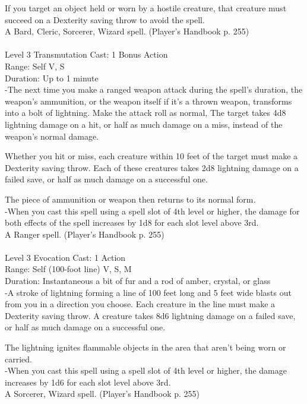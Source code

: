 \documentclass[10pt,twocolumn]{report}
\begin{document}
If you target an object held or worn by a hostile creature, that creature must succeed on a Dexterity saving throw to avoid the spell.\\
A Bard, Cleric, Sorcerer, Wizard spell. (Player's Handbook p. 255) \\


 \\
Level 3 \quad Transmutation \quad Cast: 1 Bonus Action\\
Range: Self \quad V, S\\
Duration: Up to 1 minute \quad \\
-The next time you make a ranged weapon attack during the spell’s duration, the weapon’s ammunition, or the weapon itself if it’s a thrown weapon, transforms into a bolt of lightning. Make the attack roll as normal, The target takes 4d8 lightning damage on a hit, or half as much damage on a miss, instead of the weapon’s normal damage.

Whether you hit or miss, each creature within 10 feet of the target must make a Dexterity saving throw. Each of these creatures takes 2d8 lightning damage on a failed save, or half as much damage on a successful one.

The piece of ammunition or weapon then returns to its normal form.\\
-When you cast this spell using a spell slot of 4th level or higher, the damage for both effects of the spell increases by 1d8 for each slot level above 3rd.\\
A Ranger spell. (Player's Handbook p. 255) \\


 \\
Level 3 \quad Evocation \quad Cast: 1 Action\\
Range: Self (100-foot line) \quad V, S, M\\
Duration: Instantaneous \quad a bit of fur and a rod of amber, crystal, or glass\\
-A stroke of lightning forming a line of 100 feet long and 5 feet wide blasts out from you in a direction you choose. Each creature in the line must make a Dexterity saving throw. A creature takes 8d6 lightning damage on a failed save, or half as much damage on a successful one.

The lightning ignites flammable objects in the area that aren’t being worn or carried.\\
-When you cast this spell using a spell slot of 4th level or higher, the damage increases by 1d6 for each slot level above 3rd.\\
A Sorcerer, Wizard spell. (Player's Handbook p. 255) \\
\end{document}
